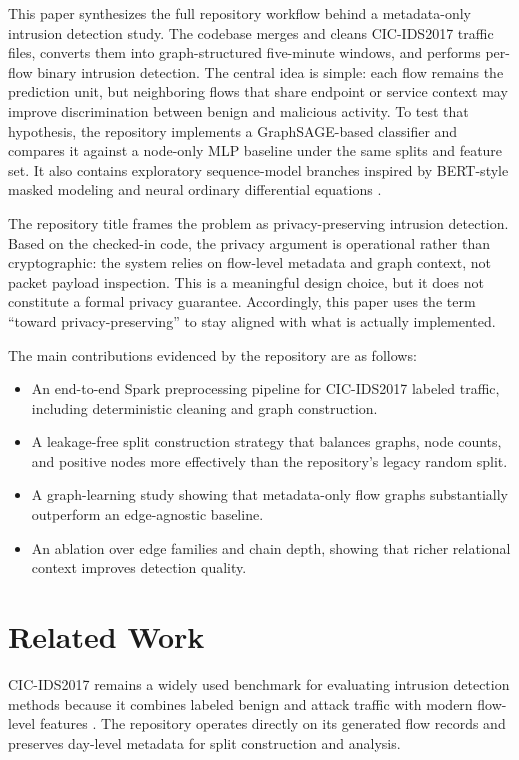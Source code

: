 \documentclass[conference]{IEEEtran}
\begin{document}
This paper synthesizes the full repository workflow behind a metadata-only intrusion detection study. The codebase merges and cleans CIC-IDS2017 traffic files, converts them into graph-structured five-minute windows, and performs per-flow binary intrusion detection. The central idea is simple: each flow remains the prediction unit, but neighboring flows that share endpoint or service context may improve discrimination between benign and malicious activity. To test that hypothesis, the repository implements a GraphSAGE-based classifier \cite{hamilton2017graphsage} and compares it against a node-only MLP baseline under the same splits and feature set. It also contains exploratory sequence-model branches inspired by BERT-style masked modeling \cite{devlin2019bert} and neural ordinary differential equations \cite{chen2018neuralode}.

The repository title frames the problem as privacy-preserving intrusion detection. Based on the checked-in code, the privacy argument is operational rather than cryptographic: the system relies on flow-level metadata and graph context, not packet payload inspection. This is a meaningful design choice, but it does not constitute a formal privacy guarantee. Accordingly, this paper uses the term ``toward privacy-preserving'' to stay aligned with what is actually implemented.

The main contributions evidenced by the repository are as follows:
\begin{itemize}
\item An end-to-end Spark preprocessing pipeline for CIC-IDS2017 labeled traffic, including deterministic cleaning and graph construction.
\item A leakage-free split construction strategy that balances graphs, node counts, and positive nodes more effectively than the repository's legacy random split.
\item A graph-learning study showing that metadata-only flow graphs substantially outperform an edge-agnostic baseline.
\item An ablation over edge families and chain depth, showing that richer relational context improves detection quality.
\end{itemize}

\section{Related Work}
CIC-IDS2017 remains a widely used benchmark for evaluating intrusion detection methods because it combines labeled benign and attack traffic with modern flow-level features \cite{sharafaldin2018cicids}. The repository operates directly on its generated flow records and preserves day-level metadata for split construction and analysis.
\end{document}
